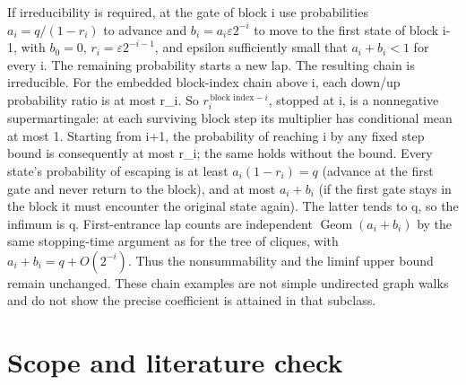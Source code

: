 \documentclass[11pt]{article}
\begin{document}
If irreducibility is required, at the gate of block i use probabilities \(a_i=q/(1-r_i)\) to advance and \(b_i=a_i \varepsilon  2^{-i}\) to move to the first state of block i-1, with \(b_0=0\), \(r_i=\varepsilon  2^{-i-1}\), and epsilon sufficiently small that \(a_i+b_i<1\) for every i. The remaining probability starts a new lap. The resulting chain is irreducible. For the embedded block-index chain above i, each down/up probability ratio is at most r\_i. So \(r_i^{\,\text{block index}-i}\), stopped at i, is a nonnegative supermartingale: at each surviving block step its multiplier has conditional mean at most 1. Starting from i+1, the probability of reaching i by any fixed step bound is consequently at most r\_i; the same holds without the bound. Every state's probability of escaping is at least \(a_i(1-r_i)=q\) (advance at the first gate and never return to the block), and at most \(a_i+b_i\) (if the first gate stays in the block it must encounter the original state again). The latter tends to q, so the infimum is q. First-entrance lap counts are independent \(\operatorname{Geom}(a_i+b_i)\) by the same stopping-time argument as for the tree of cliques, with \(a_i+b_i=q+O(2^{-i})\). Thus the nonsummability and the liminf upper bound remain unchanged. These chain examples are not simple undirected graph walks and do not show the precise coefficient is attained in that subclass.

\section{Scope and literature check}\label{scope-and-literature-check}
\end{document}
